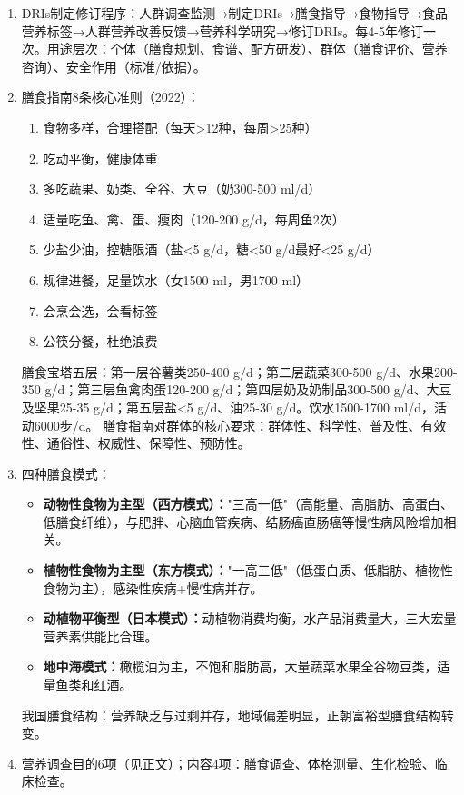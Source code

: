 {\begin{enumerate}[leftmargin=*, itemsep=5pt]
    \item DRIs制定修订程序：人群调查监测→制定DRIs→膳食指导→食物指导→食品营养标签→人群营养改善反馈→营养科学研究→修订DRIs。每4-5年修订一次。用途层次：个体（膳食规划、食谱、配方研发）、群体（膳食评价、营养咨询）、安全作用（标准/依据）。

    \item 膳食指南8条核心准则（2022）：
    \begin{enumerate}[leftmargin=*]
        \item 食物多样，合理搭配（每天>12种，每周>25种）
        \item 吃动平衡，健康体重
        \item 多吃蔬果、奶类、全谷、大豆（奶300-500 ml/d）
        \item 适量吃鱼、禽、蛋、瘦肉（120-200 g/d，每周鱼2次）
        \item 少盐少油，控糖限酒（盐<5 g/d，糖<50 g/d最好<25 g/d）
        \item 规律进餐，足量饮水（女1500 ml，男1700 ml）
        \item 会烹会选，会看标签
        \item 公筷分餐，杜绝浪费
    \end{enumerate}
    膳食宝塔五层：第一层谷薯类250-400 g/d；第二层蔬菜300-500 g/d、水果200-350 g/d；第三层鱼禽肉蛋120-200 g/d；第四层奶及奶制品300-500 g/d、大豆及坚果25-35 g/d；第五层盐<5 g/d、油25-30 g/d。饮水1500-1700 ml/d，活动6000步/d。
    膳食指南对群体的核心要求：群体性、科学性、普及性、有效性、通俗性、权威性、保障性、预防性。

    \item 四种膳食模式：
    \begin{itemize}
        \item \textbf{动物性食物为主型（西方模式）：}"三高一低"（高能量、高脂肪、高蛋白、低膳食纤维），与肥胖、心脑血管疾病、结肠癌直肠癌等慢性病风险增加相关。
        \item \textbf{植物性食物为主型（东方模式）：}"一高三低"（低蛋白质、低脂肪、植物性食物为主），感染性疾病+慢性病并存。
        \item \textbf{动植物平衡型（日本模式）：}动植物消费均衡，水产品消费量大，三大宏量营养素供能比合理。
        \item \textbf{地中海模式：}橄榄油为主，不饱和脂肪高，大量蔬菜水果全谷物豆类，适量鱼类和红酒。
    \end{itemize}
    我国膳食结构：营养缺乏与过剩并存，地域偏差明显，正朝富裕型膳食结构转变。

    \item 营养调查目的6项（见正文）；内容4项：膳食调查、体格测量、生化检验、临床检查。


\end{enumerate}}
